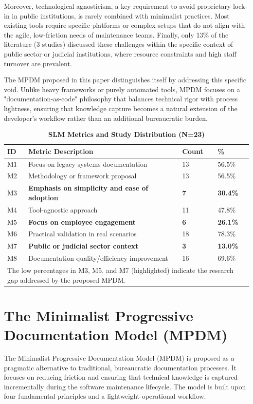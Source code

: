 \documentclass{ieeeaccess}
\begin{document}
Moreover, technological agnosticism, a key requirement to avoid proprietary lock-in in public institutions, is rarely combined with minimalist practices. Most existing tools require specific platforms or complex setups that do not align with the agile, low-friction needs of maintenance teams. Finally, only 13\% of the literature (3 studies) discussed these challenges within the specific context of public sector or judicial institutions, where resource constraints and high staff turnover are prevalent.

The MPDM proposed in this paper distinguishes itself by addressing this specific void. Unlike heavy frameworks or purely automated tools, MPDM focuses on a "documentation-as-code" philosophy that balances technical rigor with process lightness, ensuring that knowledge capture becomes a natural extension of the developer’s workflow rather than an additional bureaucratic burden.

\begin{table}
\caption{\textbf{SLM Metrics and Study Distribution (N=23)}}
\label{tab:slm_stats}
\setlength{\tabcolsep}{3pt}
\begin{tabular}{|p{25pt}|p{145pt}|p{20pt}|p{20pt}|}
\hline
ID & Metric Description & Count & \% \\
\hline
M1 & Focus on legacy systems documentation & 13 & 56.5\% \\
M2 & Methodology or framework proposal & 13 & 56.5\% \\
M3 & \textbf{Emphasis on simplicity and ease of adoption} & \textbf{7} & \textbf{30.4\%} \\
M4 & Tool-agnostic approach & 11 & 47.8\% \\
M5 & \textbf{Focus on employee engagement} & \textbf{6} & \textbf{26.1\%} \\
M6 & Practical validation in real scenarios & 18 & 78.3\% \\
M7 & \textbf{Public or judicial sector context} & \textbf{3} & \textbf{13.0\%} \\
M8 & Documentation quality/efficiency improvement & 16 & 69.6\% \\
\hline
\multicolumn{4}{p{240pt}}{The low percentages in M3, M5, and M7 (highlighted) indicate the research gap addressed by the proposed MPDM.}
\end{tabular}
\end{table}

\section{The Minimalist Progressive Documentation Model (MPDM)}
The Minimalist Progressive Documentation Model (MPDM) is proposed as a pragmatic alternative to traditional, bureaucratic documentation processes. It focuses on reducing friction and ensuring that technical knowledge is captured incrementally during the software maintenance lifecycle. The model is built upon four fundamental principles and a lightweight operational workflow.
\end{document}
